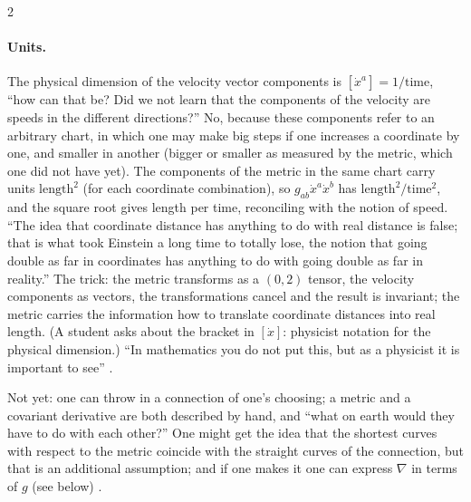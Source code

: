 \begin{paracol}{2}
\paragraph{Units.} The physical dimension of the velocity vector components is $[\dot x^a]=1/\text{time}$, ``how can that be? Did we not learn that the components of the velocity are speeds in the different directions?'' No, because these components refer to an arbitrary chart, in which one may make big steps if one increases a coordinate by one, and smaller in another (bigger or smaller as measured by the metric, which one did not have yet). The components of the metric in the same chart carry units $\text{length}^2$ (for each coordinate combination), so $g_{ab}\dot x^a\dot x^b$ has $\text{length}^2/\text{time}^2$, and the square root gives length per time, reconciling with the notion of speed. ``The idea that coordinate distance has anything to do with real distance is false; that is what took Einstein a long time to totally lose, the notion that going double as far in coordinates has anything to do with going double as far in reality.'' The trick: the metric transforms as a $(0,2)$ tensor, the velocity components as vectors, the transformations cancel and the result is invariant; the metric carries the information how to translate coordinate distances into real length. (A student asks about the bracket in $[\dot x]$: physicist notation for the physical dimension.) ``In mathematics you do not put this, but as a physicist it is important to see''
.
\begin{coursenote}
Not yet: one can throw in a connection of one's choosing; a metric and a covariant derivative are both described by hand, and ``what on earth would they have to do with each other?'' One might get the idea that the shortest curves with respect to the metric coincide with the straight curves of the connection, but that is an additional assumption; and if one makes it one can express $\nabla$ in terms of $g$ (see below) .
\end{coursenote}


\end{paracol}
